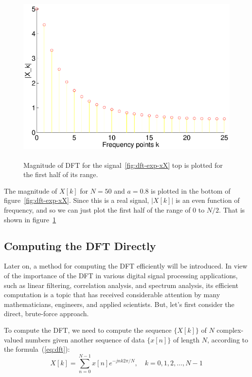 \begin{figure}
\centerline{\includegraphics[height=3.5in]{ch-fft/dft_expX2}}
\caption[First half of DFT of {$x[n] = 0.8^n$}]{Magnitude of DFT for the
signal~\protect\ref{fig:dft-exp-xX} top is plotted for the first half
of its range.
\label{fig:dft-exp-X2}}
\end{figure}

The magnitude of $X[k]$ for $N=50$ and $a=0.8$ is plotted in the bottom
of figure~\ref{fig:dft-exp-xX}.  Since this is a real signal, $|X[k]|$
is an even function of frequency, and so we can just plot the first
half of the range of 0 to $N/2$. That is shown in
figure~\ref{fig:dft-exp-X2}

\subsection{Computing the DFT Directly}

Later on, a method for computing the DFT efficiently will be introduced.
In view of the importance of the DFT in various digital signal
processing applications, such as linear filtering, correlation
analysis, and spectrum analysis, its efficient computation is a topic
that has received considerable attention by many mathematicians,
engineers, and applied scientists. But, let's first consider the
direct, brute-force approach.

To compute the DFT, we need to compute the sequence $\{X[k]\}$ of $N$
complex-valued numbers given another sequence of data $\{x[n]\}$ of
length $N$, according to the formula~(\ref{eq:dft}):
\begin{equation*}
X[k] = \sum_{n=0}^{N-1} x[n] e^{-j n k 2\pi/N}, \quad k = 0,1,2,\ldots,
N-1
\end{equation*}

